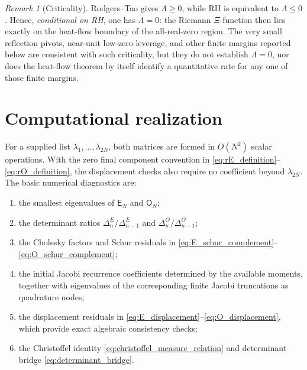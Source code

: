\documentclass[11pt]{amsart}
\numberwithin{equation}{section}
\theoremstyle{plain}
\theoremstyle{definition}
\theoremstyle{remark}
\newtheorem{remark}[theorem]{Remark}
\newcommand{\RH}{\mathrm{RH}}
\newcommand{\E}{\mathsf E}
\newcommand{\Omat}{\mathsf O}
\begin{document}
\begin{remark}[Criticality]
\label{rem:newman_criticality}
Rodgers--Tao gives \(\Lambda\ge0\), while \(\RH\) is equivalent to \(\Lambda\le0\).
Hence, \emph{conditional on RH}, one has \(\Lambda=0\): the Riemann \(\Xi\)-function then lies
exactly on the heat-flow boundary of the all-real-zero region.  The very small reflection pivots,
near-unit low-zero leverage, and other finite margins reported below are consistent with such
criticality, but they do not establish \(\Lambda=0\), nor does the heat-flow theorem by itself
identify a quantitative rate for any one of those finite margins.
\end{remark}

\section{Computational realization}
\label{sec:computational_realization}

For a supplied list $\lambda_1,\dots,\lambda_{2N}$, both matrices are formed in $O(N^2)$ scalar operations. With the zero final component convention in \eqref{eq:rE_definition}--\eqref{eq:rO_definition}, the displacement checks also require no coefficient beyond $\lambda_{2N}$. The basic numerical diagnostics are:
\begin{enumerate}[label=(\roman*)]
\item the smallest eigenvalues of $\E_N$ and $\Omat_N$;
\item the determinant ratios $\Delta_n^E/\Delta_{n-1}^E$ and $\Delta_n^O/\Delta_{n-1}^O$;
\item the Cholesky factors and Schur residuals in \eqref{eq:E_schur_complement}--\eqref{eq:O_schur_complement};
\item the initial Jacobi recurrence coefficients determined by the available moments, together with eigenvalues of the corresponding finite Jacobi truncations as quadrature nodes;
\item the displacement residuals in \eqref{eq:E_displacement}--\eqref{eq:O_displacement}, which provide exact algebraic consistency checks;
\item the Christoffel identity \eqref{eq:christoffel_measure_relation} and determinant bridge \eqref{eq:determinant_bridge}.
\end{enumerate}
\end{document}
